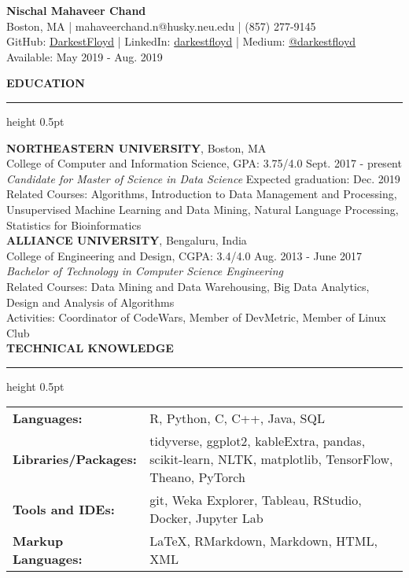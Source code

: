 \documentclass[a4paper]{article}
\newcommand{\myline}{\par
  \kern2pt %
  \hrule height 0.5pt
  \kern2pt %
}
\begin{document}
	\begin{center}
		{\Large \textbf{Nischal Mahaveer Chand}} \\
		Boston, MA | mahaveerchand.n@husky.neu.edu | (857) 277-9145 \\
                GitHub: \href{https://github.com/DarkestFloyd}{DarkestFloyd} | 
                LinkedIn: \href{https://www.linkedin.com/in/darkestfloyd}{darkestfloyd} |
								Medium: \href{https://medium.com/@darkestfloyd}{@darkestfloyd} \\
		Available: May 2019 - Aug. 2019 \\
	\end{center}
	
	\noindent
	{\large \textbf{EDUCATION}}
	\myline 
	\smallskip
	
	\noindent
	\textbf{NORTHEASTERN UNIVERSITY}, Boston, MA \\
	College of Computer and Information Science, GPA: 3.75/4.0 
        \hfill Sept. 2017 - present \\
	\textit{Candidate for Master of Science in Data Science} 
        \hfill Expected graduation: Dec. 2019 \\
        Related Courses: Algorithms, Introduction to Data Management and Processing, \\
        \hspace*{23.9mm} Unsupervised Machine Learning and Data Mining, 
        Natural Language Processing, \\
				\hspace*{23.9mm} Statistics for Bioinformatics \\
	
	\noindent
	\textbf{ALLIANCE UNIVERSITY}, Bengaluru, India \\
	College of Engineering and Design, CGPA: 3.4/4.0 \hfill Aug. 2013 - June 2017 \\
	\textit{Bachelor of Technology in Computer Science Engineering} \\
	Related Courses: 
                                    Data Mining and Data Warehousing,
                                    Big Data Analytics, 
                                    Design and Analysis of Algorithms \\
	Activities: Coordinator of CodeWars, Member of DevMetric, Member of Linux 
        Club \\
	
	\noindent
	{\large \textbf{TECHNICAL KNOWLEDGE}}
	\myline 
	
	\noindent
	\begin{tabular}{ m{3.5cm} l }
		\textbf{Languages: } & R, Python, C, C++, Java, SQL \\ 
		\textbf{Libraries/Packages: } & tidyverse, ggplot2, kableExtra, pandas, scikit-learn, NLTK, 
                 matplotlib, TensorFlow, Theano, PyTorch \\
		\textbf{Tools and IDEs: } & git, Weka Explorer, Tableau, RStudio, Docker,
                Jupyter Lab\\
		\textbf{Markup Languages: } & LaTeX, RMarkdown, Markdown, HTML, XML \\
	\end{tabular} \\
\end{document}
